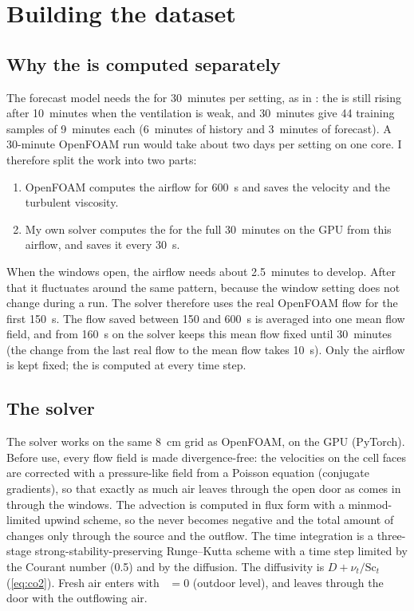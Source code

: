 \chapter{Building the \cotwo{} dataset}
\label{ch:dataset}

\section{Why the \cotwo{} is computed separately}
The forecast model needs the \cotwo{} for 30~minutes per setting, as in \citet{bian2025}: the \cotwo{} is
still rising after 10~minutes when the ventilation is weak, and 30~minutes give 44 training samples of
9~minutes each (6~minutes of history and 3~minutes of forecast). A 30-minute OpenFOAM run would take about
two days per setting on one core. I therefore split the work into two parts:
\begin{enumerate}
  \item OpenFOAM computes the airflow for 600~s and saves the velocity and the turbulent viscosity.
  \item My own solver computes the \cotwo{} for the full 30~minutes on the GPU from this airflow, and saves it
        every 30~s.
\end{enumerate}
When the windows open, the airflow needs about 2.5~minutes to develop. After that it fluctuates around the
same pattern, because the window setting does not change during a run. The \cotwo{} solver therefore uses the
real OpenFOAM flow for the first 150~s. The flow saved between 150 and 600~s is averaged into one mean flow
field, and from 160~s on the solver keeps this mean flow fixed until 30~minutes (the change from the last
real flow to the mean flow takes 10~s). Only the airflow is kept fixed; the \cotwo{} is computed at every
time step.

\section{The \cotwo{} solver}
The solver works on the same 8~cm grid as OpenFOAM, on the GPU (PyTorch). Before use, every flow field is
made divergence-free: the velocities on the cell faces are corrected with a pressure-like field from a
Poisson equation (conjugate gradients), so that exactly as much air leaves through the open door as comes in
through the windows. The advection is computed in flux form with a minmod-limited upwind scheme, so the
\cotwo{} never becomes negative and the total amount of \cotwo{} changes only through the source and the
outflow. The time integration is a three-stage strong-stability-preserving Runge--Kutta scheme with a time
step limited by the Courant number (0.5) and by the diffusion. The diffusivity is $D+\nu_t/\mathrm{Sc}_t$
(\cref{eq:co2}). Fresh air enters with \cotwo{}~$=0$ (outdoor level), and \cotwo{} leaves through the door
with the outflowing air. 

